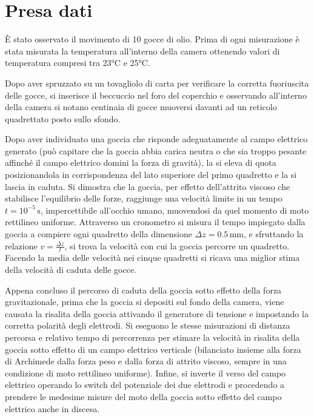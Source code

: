 \documentclass[a4paper,12pt]{article}
\begin{document}
\section{Presa dati}
È stato osservato il movimento di 10 gocce di olio. Prima di ogni misurazione è stata misurata la temperatura all'interno della camera ottenendo valori di temperatura compresi tra 23°C e 25°C.

Dopo aver spruzzato su un tovagliolo di carta per verificare la corretta fuoriuscita delle gocce, si inserisce il beccuccio nel foro del coperchio e osservando all’interno della camera si notano centinaia di gocce muoversi davanti ad un reticolo quadrettato posto sullo sfondo.

Dopo aver individuato una goccia che risponde adeguatamente al campo elettrico generato (può capitare che la goccia abbia carica neutra o che sia troppo pesante affinché il campo elettrico domini la forza di gravità), la si eleva di quota posizionandola in corrispondenza del lato superiore del primo quadretto e la si lascia in caduta. Si dimostra che la goccia, per effetto dell’attrito viscoso che stabilisce l’equilibrio delle forze, raggiunge una velocità limite in un tempo \( t = 10^{-5} \, \text{s} \), impercettibile all’occhio umano, muovendosi da quel momento di moto rettilineo uniforme. Attraverso un cronometro si misura il tempo impiegato dalla goccia a compiere ogni quadretto della dimensione \( \Delta z = 0.5 \, \text{mm} \), e sfruttando la relazione \( v = \frac{\Delta z}{t} \), si trova la velocità con cui la goccia percorre un quadretto. Facendo la media delle velocità nei cinque quadretti si ricava una miglior stima della velocità di caduta delle gocce.

Appena concluso il percorso di caduta della goccia sotto effetto della forza gravitazionale, prima che la goccia si depositi sul fondo della camera, viene causata la risalita della goccia attivando il generatore di tensione e impostando la corretta polarità degli elettrodi. Si eseguono le stesse misurazioni di distanza percorsa e relativo tempo di percorrenza per stimare la velocità in risalita della goccia sotto effetto di un campo elettrico verticale (bilanciato insieme alla forza di Archimede dalla forza peso e dalla forza di attrito viscoso, sempre in una condizione di moto rettilineo uniforme). Infine, si inverte il verso del campo elettrico operando lo switch del potenziale dei due elettrodi e procedendo a prendere le medesime misure del moto della goccia sotto effetto del campo elettrico anche in discesa.
\end{document}
